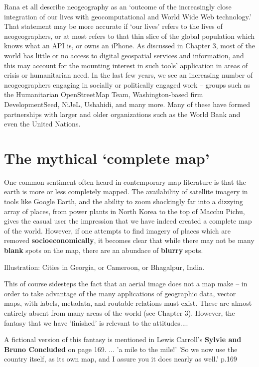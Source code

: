 \documentclass[11pt]{report}
\begin{document}
Rana et all describe neogeography as an `outcome of the increasingly close integration of our lives with geocomputational and World Wide Web technology.' That statement may be more accurate if `our lives' refers to the lives of neogeographers, or at most refers to that thin slice of the global population which knows what an API is, or owns an iPhone. As discussed in Chapter 3, most of the world has little or no access to digital geospatial services and information, and this may account for the mounting interest in such tools' application in areas of crisis or humanitarian need. In the last few years, we see an increasing number of neogeographers engaging in socially or politically engaged work -- groups such as the Humanitarian OpenStreetMap Team, Washington-based firm DevelopmentSeed, NiJeL, Ushahidi, and many more. Many of these have formed partnerships with larger and older organizations such as the World Bank and even the United Nations. 

\section{The mythical `complete map'}

One common sentiment often heard in contemporary map literature is that the earth is more or less completely mapped. The availability of satellite imagery in tools like Google Earth, and the ability to zoom shockingly far into a dizzying array of places, from power plants in North Korea to the top of Macchu Pichu, gives the casual user the impression that we have indeed created a complete map of the world. However, if one attempts to find imagery of places which are removed \textbf{socioeconomically}, it becomes clear that while there may not be many \textbf{blank} spots on the map, there are an abundace of \textbf{blurry} spots. 

Illustration: Cities in Georgia, or Cameroon, or Bhagalpur, India.

This of course sidesteps the fact that an aerial image does not a map make -- in order to take advantage of the many applications of geographic data, vector maps, with labels, metadata, and routable relations must exist. These are almost entirely absent from many areas of the world (see Chapter 3). However, the fantasy that we have 'finished' is relevant to the attitudes....

A fictional version of this fantasy is mentioned in Lewis Carroll's \textbf{Sylvie and Bruno Concluded} on page 169. ... 'a mile to the mile!'
'So we now use the country itself, as its own map, and I assure you it does nearly as well.' p.169
\end{document}
